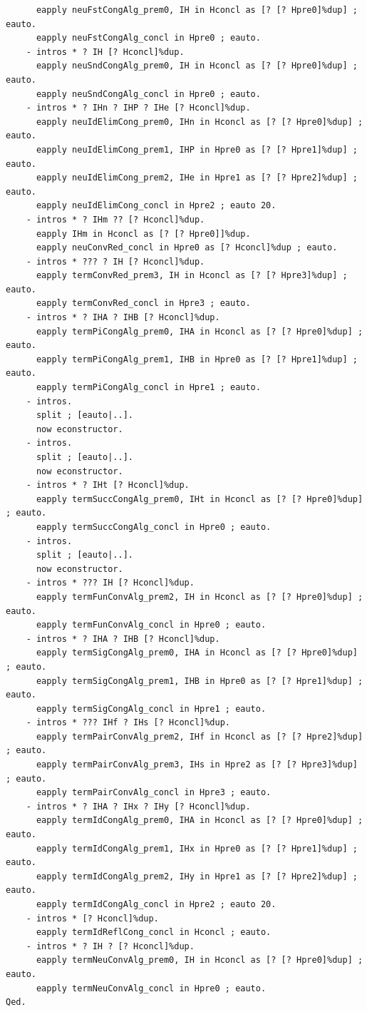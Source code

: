 \documentclass[10pt,a4paper]{amsart}
\begin{document}
\begin{lstlisting}
      eapply neuFstCongAlg_prem0, IH in Hconcl as [? [? Hpre0]%dup] ; eauto.
      eapply neuFstCongAlg_concl in Hpre0 ; eauto.
    - intros * ? IH [? Hconcl]%dup.
      eapply neuSndCongAlg_prem0, IH in Hconcl as [? [? Hpre0]%dup] ; eauto.
      eapply neuSndCongAlg_concl in Hpre0 ; eauto.
    - intros * ? IHn ? IHP ? IHe [? Hconcl]%dup.
      eapply neuIdElimCong_prem0, IHn in Hconcl as [? [? Hpre0]%dup] ; eauto.
      eapply neuIdElimCong_prem1, IHP in Hpre0 as [? [? Hpre1]%dup] ; eauto.
      eapply neuIdElimCong_prem2, IHe in Hpre1 as [? [? Hpre2]%dup] ; eauto.
      eapply neuIdElimCong_concl in Hpre2 ; eauto 20.
    - intros * ? IHm ?? [? Hconcl]%dup.
      eapply IHm in Hconcl as [? [? Hpre0]]%dup.
      eapply neuConvRed_concl in Hpre0 as [? Hconcl]%dup ; eauto.
    - intros * ??? ? IH [? Hconcl]%dup.
      eapply termConvRed_prem3, IH in Hconcl as [? [? Hpre3]%dup] ; eauto.
      eapply termConvRed_concl in Hpre3 ; eauto.
    - intros * ? IHA ? IHB [? Hconcl]%dup.
      eapply termPiCongAlg_prem0, IHA in Hconcl as [? [? Hpre0]%dup] ; eauto.
      eapply termPiCongAlg_prem1, IHB in Hpre0 as [? [? Hpre1]%dup] ; eauto.
      eapply termPiCongAlg_concl in Hpre1 ; eauto.
    - intros.
      split ; [eauto|..].
      now econstructor.
    - intros.
      split ; [eauto|..].
      now econstructor.
    - intros * ? IHt [? Hconcl]%dup.
      eapply termSuccCongAlg_prem0, IHt in Hconcl as [? [? Hpre0]%dup] ; eauto.
      eapply termSuccCongAlg_concl in Hpre0 ; eauto.
    - intros.
      split ; [eauto|..].
      now econstructor. 
    - intros * ??? IH [? Hconcl]%dup.
      eapply termFunConvAlg_prem2, IH in Hconcl as [? [? Hpre0]%dup] ; eauto.
      eapply termFunConvAlg_concl in Hpre0 ; eauto.
    - intros * ? IHA ? IHB [? Hconcl]%dup.
      eapply termSigCongAlg_prem0, IHA in Hconcl as [? [? Hpre0]%dup] ; eauto.
      eapply termSigCongAlg_prem1, IHB in Hpre0 as [? [? Hpre1]%dup] ; eauto.
      eapply termSigCongAlg_concl in Hpre1 ; eauto.
    - intros * ??? IHf ? IHs [? Hconcl]%dup.
      eapply termPairConvAlg_prem2, IHf in Hconcl as [? [? Hpre2]%dup] ; eauto.
      eapply termPairConvAlg_prem3, IHs in Hpre2 as [? [? Hpre3]%dup] ; eauto.
      eapply termPairConvAlg_concl in Hpre3 ; eauto.
    - intros * ? IHA ? IHx ? IHy [? Hconcl]%dup.
      eapply termIdCongAlg_prem0, IHA in Hconcl as [? [? Hpre0]%dup] ; eauto.
      eapply termIdCongAlg_prem1, IHx in Hpre0 as [? [? Hpre1]%dup] ; eauto.
      eapply termIdCongAlg_prem2, IHy in Hpre1 as [? [? Hpre2]%dup] ; eauto.
      eapply termIdCongAlg_concl in Hpre2 ; eauto 20.
    - intros * [? Hconcl]%dup.
      eapply termIdReflCong_concl in Hconcl ; eauto.
    - intros * ? IH ? [? Hconcl]%dup.
      eapply termNeuConvAlg_prem0, IH in Hconcl as [? [? Hpre0]%dup] ; eauto.
      eapply termNeuConvAlg_concl in Hpre0 ; eauto.
Qed.


\end{lstlisting}
\end{document}
